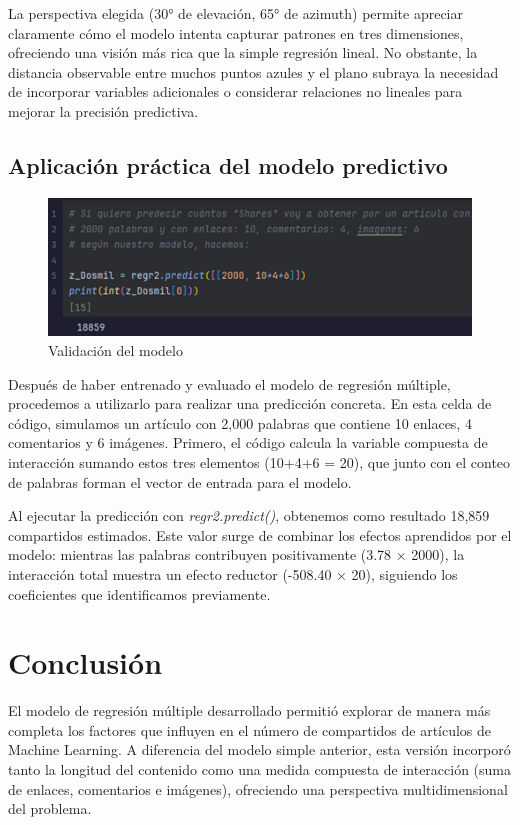 \documentclass[12pt, a4paper]{article}
\begin{document}
La perspectiva elegida (30° de elevación, 65° de azimuth) permite apreciar claramente cómo el modelo intenta capturar patrones en tres dimensiones, ofreciendo una visión más rica que la simple regresión lineal. No obstante, la distancia observable entre muchos puntos azules y el plano subraya la necesidad de incorporar variables adicionales o considerar relaciones no lineales para mejorar la precisión predictiva.

\subsection{Aplicación práctica del modelo predictivo}

\begin{figure}[H]
    \centering
    \includegraphics[width=1.0\textwidth]{Actividad-10/Imagen7.png}
    \caption{ Validación del modelo}
\end{figure}

Después de haber entrenado y evaluado el modelo de regresión múltiple, procedemos a utilizarlo para realizar una predicción concreta. En esta celda de código, simulamos un artículo con 2,000 palabras que contiene 10 enlaces, 4 comentarios y 6 imágenes. Primero, el código calcula la variable compuesta de interacción sumando estos tres elementos (10+4+6 = 20), que junto con el conteo de palabras forman el vector de entrada para el modelo.

Al ejecutar la predicción con \textit{regr2.predict()}, obtenemos como resultado 18,859 compartidos estimados. Este valor surge de combinar los efectos aprendidos por el modelo: mientras las palabras contribuyen positivamente (3.78 × 2000), la interacción total muestra un efecto reductor (-508.40 × 20), siguiendo los coeficientes que identificamos previamente.

\newpage

\section{Conclusión}
El modelo de regresión múltiple desarrollado permitió explorar de manera más completa los factores que influyen en el número de compartidos de artículos de Machine Learning. A diferencia del modelo simple anterior, esta versión incorporó tanto la longitud del contenido como una medida compuesta de interacción (suma de enlaces, comentarios e imágenes), ofreciendo una perspectiva multidimensional del problema.
\end{document}
